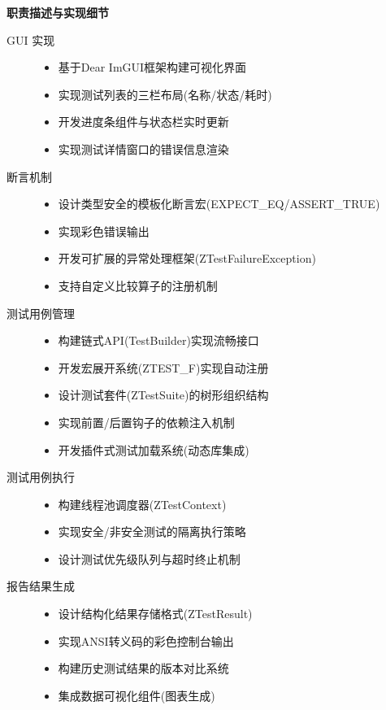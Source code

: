 \documentclass[chinese]{article}
\begin{document}
\centering
\textbf{职责描述与实现细节}
\begin{description}
    \item[GUI 实现]
          \begin{itemize}
              \item 基于Dear ImGUI框架构建可视化界面
              \item 实现测试列表的三栏布局(名称/状态/耗时)
              \item 开发进度条组件与状态栏实时更新
              \item 实现测试详情窗口的错误信息渲染
          \end{itemize}
    \item[断言机制]
          \begin{itemize}
              \item 设计类型安全的模板化断言宏(EXPECT\_EQ/ASSERT\_TRUE)
              \item 实现彩色错误输出
              \item 开发可扩展的异常处理框架(ZTestFailureException)
              \item 支持自定义比较算子的注册机制
          \end{itemize}
    \item[测试用例管理]
          \begin{itemize}
              \item 构建链式API(TestBuilder)实现流畅接口
              \item 开发宏展开系统(ZTEST\_F)实现自动注册
              \item 设计测试套件(ZTestSuite)的树形组织结构
              \item 实现前置/后置钩子的依赖注入机制
              \item 开发插件式测试加载系统(动态库集成)
          \end{itemize}
    \item[测试用例执行]
          \begin{itemize}
              \item 构建线程池调度器(ZTestContext)
              \item 实现安全/非安全测试的隔离执行策略
              \item 设计测试优先级队列与超时终止机制
          \end{itemize}
    \item[报告结果生成]
          \begin{itemize}
              \item 设计结构化结果存储格式(ZTestResult)
              \item 实现ANSI转义码的彩色控制台输出
              \item 构建历史测试结果的版本对比系统
              \item 集成数据可视化组件(图表生成)
          \end{itemize}
\end{description}
\end{document}

